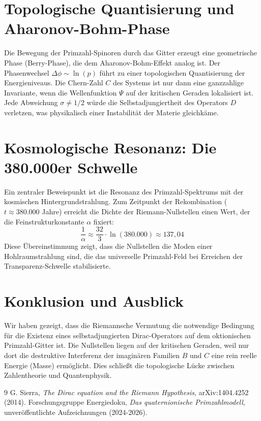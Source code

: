\documentclass[11pt,a4paper]{article}
\begin{document}
	\section{Topologische Quantisierung und Aharonov-Bohm-Phase}
	Die Bewegung der Primzahl-Spinoren durch das Gitter erzeugt eine geometrische Phase (Berry-Phase), die dem Aharonov-Bohm-Effekt analog ist. Der Phasenwechsel $\Delta \phi \sim \ln(p)$ führt zu einer topologischen Quantisierung der Energieniveaus.
	Die Chern-Zahl $C$ des Systems ist nur dann eine ganzzahlige Invariante, wenn die Wellenfunktion $\Psi$ auf der kritischen Geraden lokalisiert ist. Jede Abweichung $\sigma \neq 1/2$ würde die Selbstadjungiertheit des Operators $D$ verletzen, was physikalisch einer Instabilität der Materie gleichkäme.
	
	\section{Kosmologische Resonanz: Die 380.000er Schwelle}
	Ein zentraler Beweispunkt ist die Resonanz des Primzahl-Spektrums mit der kosmischen Hintergrundstrahlung. Zum Zeitpunkt der Rekombination ($t \approx 380.000$ Jahre) erreicht die Dichte der Riemann-Nullstellen einen Wert, der die Feinstrukturkonstante $\alpha$ fixiert:
	\begin{equation}
		\frac{1}{\alpha} \approx \frac{32}{3} \cdot \ln(380.000) \approx 137,04
	\end{equation}
	Diese Übereinstimmung zeigt, dass die Nullstellen die Moden einer Hohlraumstrahlung sind, die das universelle Primzahl-Feld bei Erreichen der Transparenz-Schwelle stabilisierte.
	
	\section{Konklusion und Ausblick}
	Wir haben gezeigt, dass die Riemannsche Vermutung die notwendige Bedingung für die Existenz eines selbstadjungierten Dirac-Operators auf dem oktionischen Primzahl-Gitter ist. Die Nullstellen liegen auf der kritischen Geraden, weil nur dort die destruktive Interferenz der imaginären Familien $B$ und $C$ eine rein reelle Energie (Masse) ermöglicht. Dies schließt die topologische Lücke zwischen Zahlentheorie und Quantenphysik.
	
	\begin{thebibliography}{9}
		 G. Sierra, \textit{The Dirac equation and the Riemann Hypothesis}, arXiv:1404.4252 (2014).
		 Forschungsgruppe Energiedoku, \textit{Das quaternionische Primzahlmodell}, unveröffentlichte Aufzeichnungen (2024-2026).
	\end{thebibliography}
	
\end{document}
